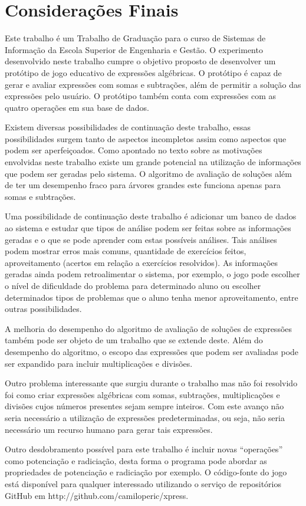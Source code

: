 \part{Considerações Finais}
Este trabalho é um Trabalho de Graduação para o curso de Sistemas de Informação da Escola Superior de Engenharia e Gestão. O experimento desenvolvido neste trabalho cumpre o objetivo proposto de desenvolver um protótipo de jogo educativo de expressões algébricas. O protótipo é capaz de gerar e avaliar expressões com somas e subtrações, além de permitir a solução das expressões pelo usuário. O protótipo também conta com expressões com as quatro operações em sua base de dados.

Existem diversas possibilidades de continuação deste trabalho, essas possibilidades surgem tanto de aspectos incompletos assim como aspectos que podem ser aperfeiçoados. Como apontado no texto sobre as motivações envolvidas neste trabalho existe um grande potencial na utilização de informações que podem ser geradas pelo sistema. O algoritmo de avaliação de soluções além de ter um desempenho fraco para árvores grandes este funciona apenas para somas e subtrações.

Uma possibilidade de continuação deste trabalho é adicionar um banco de dados ao sistema e estudar que tipos de análise podem ser feitas sobre as informações geradas e o que se pode aprender com estas possíveis análises. Tais análises podem mostrar erros mais comuns, quantidade de exercícios feitos, aproveitamento (acertos em relação a exercícios resolvidos). As informações geradas ainda podem retroalimentar o sistema, por exemplo, o jogo pode escolher o  nível de dificuldade do problema para determinado aluno ou escolher determinados tipos de problemas que o aluno tenha menor aproveitamento, entre outras possibilidades.

A melhoria do desempenho do algoritmo de avaliação de soluções de expressões também pode ser objeto de um trabalho que se extende deste. Além do desempenho do algoritmo, o escopo das expressões que podem ser avaliadas pode ser expandido para incluir multiplicações e divisões.

Outro problema interessante que surgiu durante o trabalho mas não foi resolvido foi como criar expressões algébricas com somas, subtrações, multiplicações e divisões cujos números presentes sejam sempre inteiros. Com este avanço não seria necessário a utilização de expressões predeterminadas, ou seja, não seria necessário um recurso humano para gerar tais expressões.

Outro desdobramento possível para este trabalho é incluir novas “operações” como potenciação e radiciação, desta forma o programa pode abordar as propriedades de potenciação e radiciação por exemplo.
O código-fonte do jogo está disponível para qualquer interessado utilizando o serviço de repositórios GitHub em http://github.com/camiloperic/xpress.

